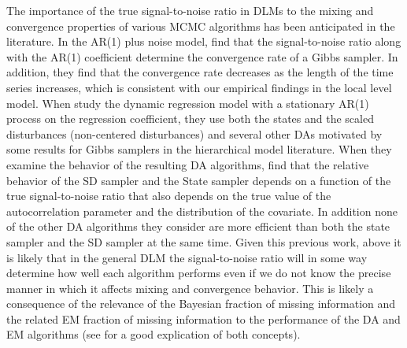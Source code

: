 \documentclass[12pt]{article}
\begin{document}
The importance of the true signal-to-noise ratio in DLMs to the mixing and convergence properties of various MCMC algorithms has been anticipated in the literature. In the AR(1) plus noise model, \citet{pitt1999analytic} find that the signal-to-noise ratio along with the AR(1) coefficient determine the convergence rate of a Gibbs sampler. In addition, they find that the convergence rate decreases as the length of the time series increases, which is consistent with our empirical findings in the local level model. When \citet{fruhwirth2004efficient} study the dynamic regression model with a stationary AR(1) process on the regression coefficient, they use both the states and the scaled disturbances (non-centered disturbances) and several other DAs motivated by some results for Gibbs samplers in the hierarchical model literature. When they examine the behavior of the resulting DA algorithms, \citet{fruhwirth2004efficient} find that the relative behavior of the SD sampler and the State sampler depends on a function of the true signal-to-noise ratio that also depends on the true value of the autocorrelation parameter and the distribution of the covariate. In addition none of the other DA algorithms they consider are more efficient than both the state sampler and the SD sampler at the same time. Given this previous work, above it is likely that in the general DLM the signal-to-noise ratio will in some way determine how well each algorithm performs even if we do not know the precise manner in which it affects mixing and convergence behavior. This is likely a consequence of the relevance of the Bayesian fraction of missing information and the related EM fraction of missing information to the performance of the DA and EM algorithms (see \citet{van2001art} for a good explication of both concepts).
\end{document}
